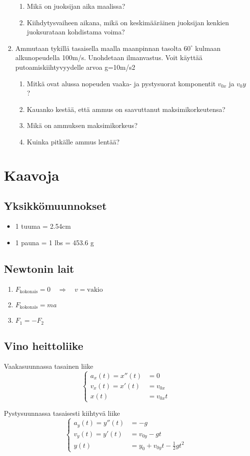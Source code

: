 \documentclass[12pt]{article}
\begin{document}
\begin{enumerate}
\begin{enumerate}
\item Mikä on juoksijan aika maalissa?
\item Kiihdytysvaiheen aikana, mikä on keskimääräinen juoksijan kenkien juoksurataan kohdistama voima?
\end{enumerate}
\item Ammutaan tykillä tasaisella maalla maanpinnan tasolta $60^\circ$
kulmaan alkunopeudella 100m/s. Unohdetaan ilmanvastus. Voit käyttää putoamiskiihtyvyydelle arvoa g=10m/s2
\begin{enumerate}
\item Mitkä ovat alussa nopeuden vaaka- ja pystysuorat komponentit $v_{0x}$ ja $v_0y$?
\item Kauanko kestää, että ammus on saavuttanut maksimikorkeutensa?
\item Mikä on ammuksen maksimikorkeus?
\item Kuinka pitkälle ammus lentää?
\end{enumerate}
\end{enumerate}

\section*{Kaavoja}

\subsection*{Yksikkömuunnokset}
\begin{itemize}
\item 1 tuuma = 2.54cm
\item 1 pauna = 1 lbs = 453.6 g
\end{itemize}

\subsection*{Newtonin lait}
\begin{enumerate}
\item $F_{\textrm{kokonais}}=0 \quad\Rightarrow\quad v=\textrm{vakio}$
\item $F_{\textrm{kokonais}}=ma$
\item $F_1=-F_2$
\end{enumerate}

\subsection*{Vino heittoliike}

Vaakasuunnassa tasainen liike
$$
\begin{cases}
a_x(t)=x''(t)&=0\\
v_x(t)=x'(t)&=v_{0x}\\
x(t)&=v_{0x}t
\end{cases}
$$

Pystysuunnassa tasaisesti kiihtyvä liike
$$
\begin{cases}
a_y(t)=y''(t)&=-g\\
v_y(t)=y'(t)&=v_{0y}-gt\\
y(t)&=y_0+v_{0y}t-\frac12 gt^2
\end{cases}
$$
\end{document}
